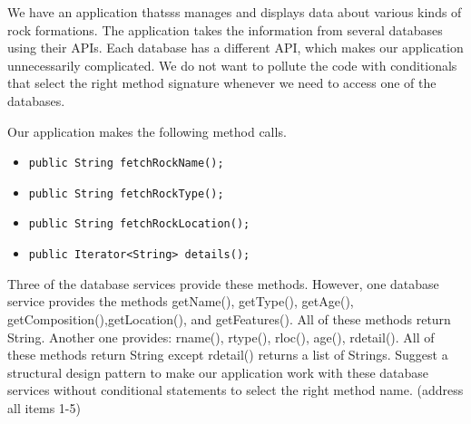 \question[12] We have an application thatsss manages and displays data about various kinds of rock formations. The application takes the information from several databases using their APIs. Each database has a different API, which makes our application unnecessarily complicated. We do not want to pollute the code with conditionals that select the right method signature whenever we need to access one of the databases.

Our application makes the following method calls.
\begin{itemize}[label={}]
    \item \begin{verbatim} 
public String fetchRockName();
\end{verbatim} 
    \item \begin{verbatim} 
public String fetchRockType();
    \end{verbatim}
    \item \begin{verbatim} 
public String fetchRockLocation();
    \end{verbatim}
    \item \begin{verbatim} 
public Iterator<String> details();
    \end{verbatim}
\end{itemize}

Three of the database services provide these methods.
However, one database service provides the methods getName(), getType(), getAge(), getComposition(),getLocation(), and getFeatures(). All of these methods return String. 
Another one provides: rname(), rtype(), rloc(), age(), rdetail().  All of these methods return String except rdetail() returns a list of Strings.
Suggest a structural design pattern to make our application work with these database services without conditional statements to select the right method name.
(address all items 1-5)


